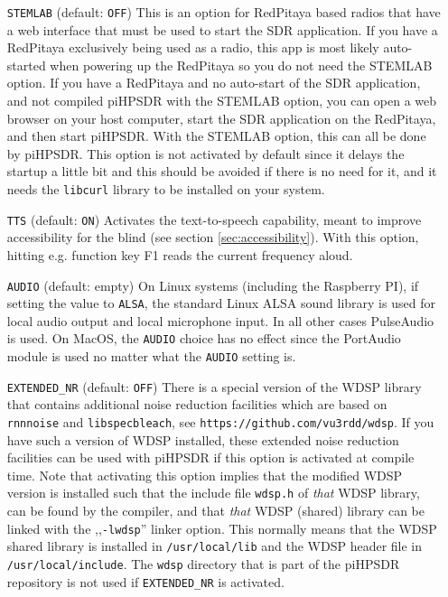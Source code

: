 \documentclass[12pt]{book}
\def\rett#1{\texttt{\color{red}#1}}
\def\pH{pi\-HPSDR\xspace}
\begin{document}
\begin{itemize}
\item[\rett{STEMLAB}] {(default: \texttt{OFF})
This is an option for RedPitaya based radios that have a web interface that must be used
to start the SDR application. If you have a RedPitaya exclusively being used as a radio, this
app is most likely auto-started when powering up the RedPitaya so you do not need the STEMLAB
option.
If you have a RedPitaya and no auto-start of the SDR application, and not compiled \pH
with the STEMLAB option, you can open a web browser on your host computer, start the SDR application on the RedPitaya,
and then start \pH. With the STEMLAB option, this can all be done by \pH.
This option is not activated by default since it delays the startup a little bit  and  this should  be
avoided if  there is no need for it, and it needs the \texttt{libcurl}  library to be installed on your system.
}

\item[\rett{TTS}] {(default: \texttt{ON})
Activates the text-to-speech capability, meant to improve accessibility for the blind
(see section \ref{sec:accessibility}). With this option, hitting e.g. function key F1
reads the current frequency aloud.
}

\item[\rett{AUDIO}] {(default: empty)
On Linux systems (including the Raspberry PI), if setting the value to \texttt{ALSA},
the standard Linux ALSA sound library is used for local audio
output and local microphone input. In all other cases
PulseAudio is used. On MacOS, the \texttt{AUDIO} choice has no effect since the PortAudio
module is used no matter what the \texttt{AUDIO} setting is.
}

\item[\rett{EXTENDED\_NR}] {(default: \texttt{OFF})
There is a special version of the WDSP library that contains additional noise
reduction facilities which are based on  \texttt{rnnnoise} and \texttt{libspecbleach}, see
 \texttt{https://github.com/vu3rdd/wdsp}. If you have such a version of WDSP installed, these
 extended noise reduction facilities can be used with \pH if this option is activated
 at compile time.
 Note that activating this option implies that the modified WDSP version is installed such
 that the include file \texttt{wdsp.h} of \textit{that}
 WDSP library, can be found by the compiler, and that \textit{that} WDSP (shared)
 library can be linked with the ,,\texttt{-lwdsp}'' linker option. This normally means
 that the WDSP shared library is installed in \texttt{/usr/local/lib} and the WDSP header file
 in \texttt{/usr/local/include}. The \texttt{wdsp} directory that is part of
 the \pH repository is not used if \texttt{EXTENDED\_NR} is activated.}

\end{itemize}
\end{document}
